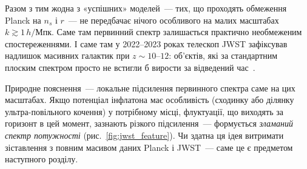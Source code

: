Разом з тим жодна з «успішних» моделей~--- тих, що проходять
обмеження Planck на $n_s$ і $r$~--- не передбачає нічого
особливого на малих масштабах $k \gtrsim 1\,h/$Мпк. Саме там
первинний спектр залишається практично необмеженим
спостереженнями. І саме там у 2022--2023 роках телескоп JWST
зафіксував надлишок масивних галактик при $z \sim 10$--$12$:
об'єктів, які за стандартним плоским спектром просто не встигли
б вирости за відведений час~\cite{finkelstein_2023,boylan_kolchin_2023}.

Природне пояснення~--- локальне підсилення первинного спектра
саме на цих масштабах. Якщо потенціал інфлатона має особливість
(сходинку або ділянку ультра-повільного кочення) у потрібному
місці, флуктуації, що виходять за горизонт в цей момент,
зазнають різкого підсилення~--- формується \emph{зламаний спектр
потужності} (рис.~\ref{fig:jwst_feature}). Чи здатна ця ідея витримати зіставлення з повним
масивом даних Planck і JWST~--- саме це є предметом
наступного розділу.

